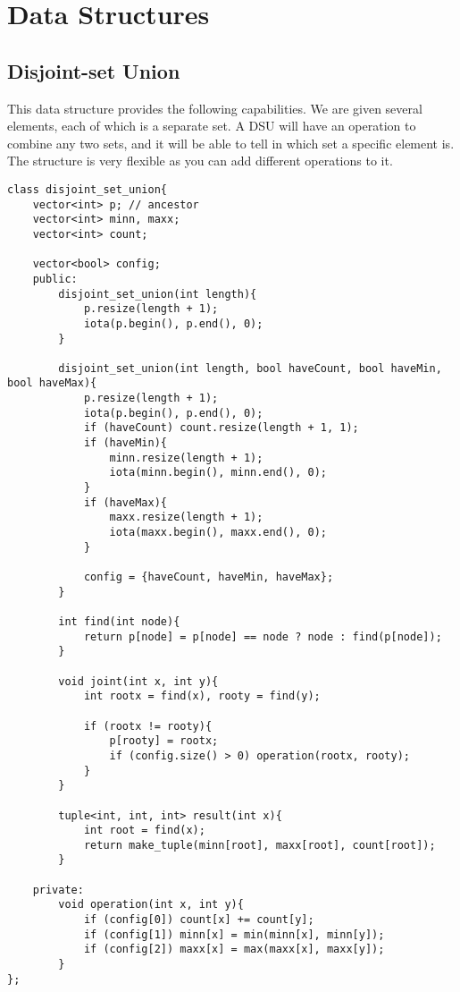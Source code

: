 \documentclass{article}
\begin{document}
\pagebreak
\section{Data Structures}
\subsection{Disjoint-set Union}
This data structure provides the following capabilities. 
We are given several elements, each of which is a separate set. 
A DSU will have an operation to combine any two sets, 
and it will be able to tell in which set a specific element is. 
The structure is very flexible as you can add different operations to it.
\begin{verbatim}
class disjoint_set_union{
    vector<int> p; // ancestor
    vector<int> minn, maxx;
    vector<int> count;
    
    vector<bool> config;
    public:
        disjoint_set_union(int length){
            p.resize(length + 1);
            iota(p.begin(), p.end(), 0);
        }
        
        disjoint_set_union(int length, bool haveCount, bool haveMin, bool haveMax){
            p.resize(length + 1);
            iota(p.begin(), p.end(), 0);
            if (haveCount) count.resize(length + 1, 1);
            if (haveMin){
                minn.resize(length + 1);
                iota(minn.begin(), minn.end(), 0);
            }
            if (haveMax){
                maxx.resize(length + 1);
                iota(maxx.begin(), maxx.end(), 0);
            }
            
            config = {haveCount, haveMin, haveMax};
        }
        
        int find(int node){
            return p[node] = p[node] == node ? node : find(p[node]);
        }
        
        void joint(int x, int y){
            int rootx = find(x), rooty = find(y);

            if (rootx != rooty){
                p[rooty] = rootx;
                if (config.size() > 0) operation(rootx, rooty);
            }
        }
        
        tuple<int, int, int> result(int x){
            int root = find(x);
            return make_tuple(minn[root], maxx[root], count[root]);
        }
        
    private:
        void operation(int x, int y){
            if (config[0]) count[x] += count[y];
            if (config[1]) minn[x] = min(minn[x], minn[y]);
            if (config[2]) maxx[x] = max(maxx[x], maxx[y]);
        }
};
\end{verbatim}
\end{document}
